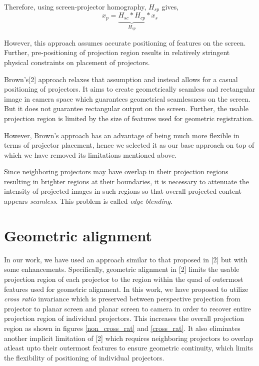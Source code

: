 \documentclass[conference]{/home/pranav/Desktop/Publication_work/latex_class_files/IEEEtran}
\begin{document}
Therefore, using screen-projector homography, $H_{sp}$ gives,
\begin{equation}
x_{p}=\underbrace{H_{sc}*H_{cp}}_{H_{sp}}*x_{s}
\end{equation}

However, this approach assumes accurate positioning of features on the screen. Further, pre-positioning of projection region results in relatively stringent physical constraints on placement of projectors.\par

Brown's[2] approach relaxes that assumption and instead allows for a casual positioning of projectors. It aims to create geometrically seamless and rectangular image in camera space which guarantees geometrical seamlessness on the screen. But it does not guarantee rectangular output on the screen. Further, the usable projection region is limited by the size of features used for geometric registration.  

However, Brown's approach has an advantage of being much more flexible in terms of projector placement, hence we selected it as our base approach on top of which we have removed its limitations mentioned above.\par

Since neighboring projectors may have overlap in their projection regions resulting in brighter regions at their boundaries, it is necessary to attenuate the intensity of projected images in such regions so that overall projected content appears \textit{seamless}. This problem is called \textit{edge blending}.

\section{Geometric alignment}
In our work, we have used an approach similar to that proposed in [2] but with some enhancements. Specifically, geometric alignment in [2] limits the usable projection region of each projector to the region within the quad of outermost features used for geometric alignment. In this work, we have proposed to utilize \textit{cross ratio} invariance which is preserved between perspective projection from projector to planar screen and planar screen to camera in order to recover entire projection region of individual projectors. This increases the overall projection region as shown in figures \ref{non_cross_rat} and \ref{cross_rat}. It also eliminates another implicit limitation of [2] which requires neighboring projectors to overlap atleast upto their outermost features to ensure geometric continuity, which limits the flexibility of positioning of individual projectors. 
\end{document}
